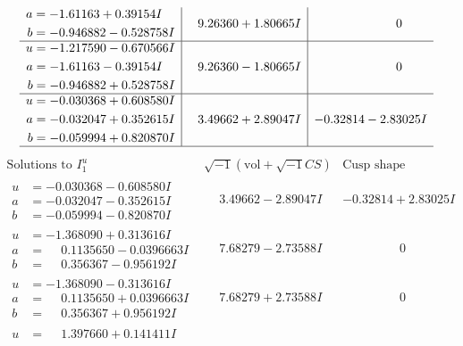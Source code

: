 \documentclass[1p]{elsarticle_modified}
\theoremstyle{definition}
\newcommand{\I}{\sqrt{-1}}
\begin{document}
$$\begin{array}{c|c|c}
\begin{aligned}
a &= -1.61163 + 0.39154 I \\
b &= -0.946882 - 0.528758 I\end{aligned}
 & \phantom{-}9.26360 + 1.80665 I & \phantom{-0.000000 } 0 \\ \hline\begin{aligned}
u &= -1.217590 - 0.670566 I \\
a &= -1.61163 - 0.39154 I \\
b &= -0.946882 + 0.528758 I\end{aligned}
 & \phantom{-}9.26360 - 1.80665 I & \phantom{-0.000000 } 0 \\ \hline\begin{aligned}
u &= -0.030368 + 0.608580 I \\
a &= -0.032047 + 0.352615 I \\
b &= -0.059994 + 0.820870 I\end{aligned}
 & \phantom{-}3.49662 + 2.89047 I & -0.32814 - 2.83025 I\\
 \hline 
 \end{array}$$\newpage$$\begin{array}{c|c|c}  
\text{Solutions to }I^u_{1}& \I (\text{vol} + \sqrt{-1}CS) & \text{Cusp shape}\\
 \hline 
\begin{aligned}
u &= -0.030368 - 0.608580 I \\
a &= -0.032047 - 0.352615 I \\
b &= -0.059994 - 0.820870 I\end{aligned}
 & \phantom{-}3.49662 - 2.89047 I & -0.32814 + 2.83025 I \\ \hline\begin{aligned}
u &= -1.368090 + 0.313616 I \\
a &= \phantom{-}0.1135650 - 0.0396663 I \\
b &= \phantom{-}0.356367 - 0.956192 I\end{aligned}
 & \phantom{-}7.68279 - 2.73588 I & \phantom{-0.000000 } 0 \\ \hline\begin{aligned}
u &= -1.368090 - 0.313616 I \\
a &= \phantom{-}0.1135650 + 0.0396663 I \\
b &= \phantom{-}0.356367 + 0.956192 I\end{aligned}
 & \phantom{-}7.68279 + 2.73588 I & \phantom{-0.000000 } 0 \\ \hline\begin{aligned}
u &= \phantom{-}1.397660 + 0.141411 I \\

\end{aligned}
\end{array}$$
\end{document}
